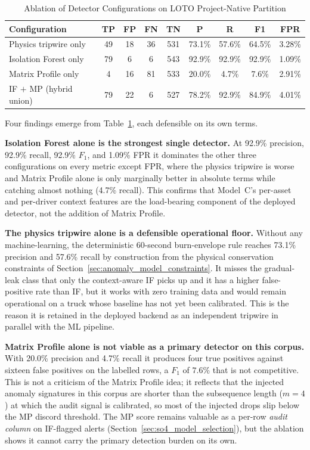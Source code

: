 \begin{table}[!htbp]
\centering
\caption{Ablation of Detector Configurations on LOTO Project-Native Partition}
\label{tab:ablation_detector_configs}
\small
\begin{tabular}{|p{}|c|c|c|c|c|c|c|c|}
\hline
\textbf{Configuration} & \textbf{TP} & \textbf{FP} & \textbf{FN} & \textbf{TN} & \textbf{P} & \textbf{R} & \textbf{F1} & \textbf{FPR} \\
\hline
Physics tripwire only          & 49 & 18 & 36 & 531 & 73.1\% & 57.6\% & 64.5\% & 3.28\% \\
\hline
Isolation Forest only          & 79 &  6 &  6 & 543 & 92.9\% & 92.9\% & 92.9\% & 1.09\% \\
\hline
Matrix Profile only            &  4 & 16 & 81 & 533 & 20.0\% &  4.7\% &  7.6\% & 2.91\% \\
\hline
IF $+$ MP (hybrid union)       & 79 & 22 &  6 & 527 & 78.2\% & 92.9\% & 84.9\% & 4.01\% \\
\hline
\end{tabular}
\end{table}

Four findings emerge from Table~\ref{tab:ablation_detector_configs}, each defensible on its own terms.

\textbf{Isolation Forest alone is the strongest single detector.} At 92.9\% precision, 92.9\% recall, 92.9\% $F_1$, and 1.09\% FPR it dominates the other three configurations on every metric except FPR, where the physics tripwire is worse and Matrix Profile alone is only marginally better in absolute terms while catching almost nothing (4.7\% recall). This confirms that Model~C's per-asset and per-driver context features are the load-bearing component of the deployed detector, not the addition of Matrix Profile.

\textbf{The physics tripwire alone is a defensible operational floor.} Without any machine-learning, the deterministic 60-second burn-envelope rule reaches 73.1\% precision and 57.6\% recall by construction from the physical conservation constraints of Section~\ref{sec:anomaly_model_constraints}. It misses the gradual-leak class that only the context-aware IF picks up and it has a higher false-positive rate than IF, but it works with zero training data and would remain operational on a truck whose baseline has not yet been calibrated. This is the reason it is retained in the deployed backend as an independent tripwire in parallel with the ML pipeline.

\textbf{Matrix Profile alone is not viable as a primary detector on this corpus.} With 20.0\% precision and 4.7\% recall it produces four true positives against sixteen false positives on the labelled rows, a $F_1$ of $7.6\%$ that is not competitive. This is not a criticism of the Matrix Profile idea; it reflects that the injected anomaly signatures in this corpus are shorter than the subsequence length ($m = 4$) at which the audit signal is calibrated, so most of the injected drops slip below the MP discord threshold. The MP score remains valuable as a per-row \emph{audit column} on IF-flagged alerts (Section~\ref{sec:so4_model_selection}), but the ablation shows it cannot carry the primary detection burden on its own.

